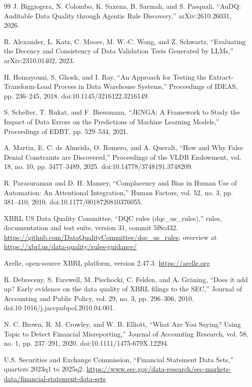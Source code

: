 \documentclass[11pt,a4paper]{article}
\begin{document}
\begin{thebibliography}{99}
 J. Biggiogera, N. Colombo, K. Saxena, B. Sarmah, and S. Pasquali, ``AuDQ: Auditable Data Quality through Agentic Rule Discovery,'' arXiv:2610.26031, 2026.

 R. Alexander, L. Katz, C. Moore, M. W.-C. Wong, and Z. Schwartz, ``Evaluating the Decency and Consistency of Data Validation Tests Generated by LLMs,'' arXiv:2310.01402, 2023.

 H. Homayouni, S. Ghosh, and I. Ray, ``An Approach for Testing the Extract-Transform-Load Process in Data Warehouse Systems,'' Proceedings of IDEAS, pp. 236--245, 2018. doi:10.1145/3216122.3216149.

 S. Schelter, T. Rukat, and F. Biessmann, ``JENGA: A Framework to Study the Impact of Data Errors on the Predictions of Machine Learning Models,'' Proceedings of EDBT, pp. 529--534, 2021.

 A. Martin, E. C. de Almeida, O. Romero, and A. Queralt, ``How and Why False Denial Constraints are Discovered,'' Proceedings of the VLDB Endowment, vol. 18, no. 10, pp. 3477--3489, 2025. doi:10.14778/3748191.3748209.

 R. Parasuraman and D. H. Manzey, ``Complacency and Bias in Human Use of Automation: An Attentional Integration,'' Human Factors, vol. 52, no. 3, pp. 381--410, 2010. doi:10.1177/0018720810376055.

 XBRL US Data Quality Committee, ``DQC rules (dqc\_us\_rules),'' rules, documentation and test suite, version 31, commit 5f8cd32. \url{https://github.com/DataQualityCommittee/dqc_us_rules}; overview at \url{https://xbrl.us/data-quality/rules-guidance/}

 Arelle, open-source XBRL platform, version 2.47.3. \url{https://arelle.org}

 R. Debreceny, S. Farewell, M. Piechocki, C. Felden, and A. Gr\"aning, ``Does it add up? Early evidence on the data quality of XBRL filings to the SEC,'' Journal of Accounting and Public Policy, vol. 29, no. 3, pp. 296--306, 2010. doi:10.1016/j.jaccpubpol.2010.04.001.

 N. C. Brown, R. M. Crowley, and W. B. Elliott, ``What Are You Saying? Using Topic to Detect Financial Misreporting,'' Journal of Accounting Research, vol. 58, no. 1, pp. 237--291, 2020. doi:10.1111/1475-679X.12294.

 U.S. Securities and Exchange Commission, ``Financial Statement Data Sets,'' quarters 2023q1 to 2025q2. \url{https://www.sec.gov/data-research/sec-markets-data/financial-statement-data-sets}


\end{thebibliography}
\end{document}
